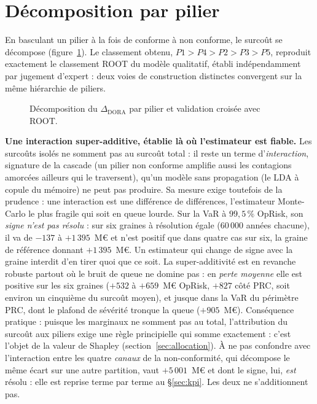 \section{Décomposition par pilier}

En basculant un pilier à la fois de conforme à non conforme, le surcoût se décompose
(figure~\ref{fig:decomp}). Le classement obtenu, $P1>P4>P2>P3>P5$, reproduit exactement
le classement ROOT du modèle qualitatif, établi indépendamment par jugement d'expert : deux
voies de construction distinctes convergent sur la même hiérarchie de piliers.

\begin{figure}[htbp]\centering
{}
\caption{Décomposition du $\Delta_{\text{DORA}}$ par pilier et validation croisée avec ROOT.
}
\label{fig:decomp}
\end{figure}

\begin{cle}
\textbf{Une interaction super-additive, établie là où l'estimateur est fiable.} Les surcoûts
isolés ne somment pas au surcoût total : il reste un terme d'\emph{interaction}, signature de la
cascade (un pilier non conforme amplifie aussi les contagions amorcées ailleurs qui le
traversent), qu'un modèle sans propagation (le LDA à copule du mémoire) ne peut pas produire.
Sa mesure exige toutefois de la prudence : une interaction est une différence de différences,
l'estimateur Monte-Carlo le plus fragile qui soit en queue lourde. Sur la VaR à $99{,}5\,\%$
OpRisk, son \emph{signe n'est pas résolu} : sur six graines à résolution égale
($60\,000$ années chacune), il va de $-137$ à $+1\,395$~M\euro{} et n'est positif que dans
quatre cas sur six, la graine de référence donnant $+1\,395$~M\euro{}. Un estimateur
qui change de signe avec la graine interdit d'en tirer quoi que ce soit. La super-additivité
est en revanche robuste partout où le bruit de queue ne domine pas : en \emph{perte moyenne}
elle est positive sur les six graines ($+532$ à $+659$~M\euro{} OpRisk, $+827$
côté PRC, soit environ un cinquième du surcoût moyen), et jusque dans la VaR du périmètre PRC,
dont le plafond de sévérité tronque la queue ($+905$~M\euro{}). Conséquence pratique : puisque les
marginaux ne somment pas au total, l'attribution du surcoût aux piliers exige une règle
principielle qui somme exactement : c'est l'objet de la valeur de Shapley
(section~\ref{sec:allocation}). À ne pas confondre avec l'interaction entre les quatre
\emph{canaux} de la non-conformité, qui décompose le même écart sur une autre partition, vaut
$+5\,001$~M\euro{} et dont le signe, lui, \emph{est} résolu : elle est reprise terme par terme au
\S\ref{sec:kpi}. Les deux ne s'additionnent pas.
\end{cle}

